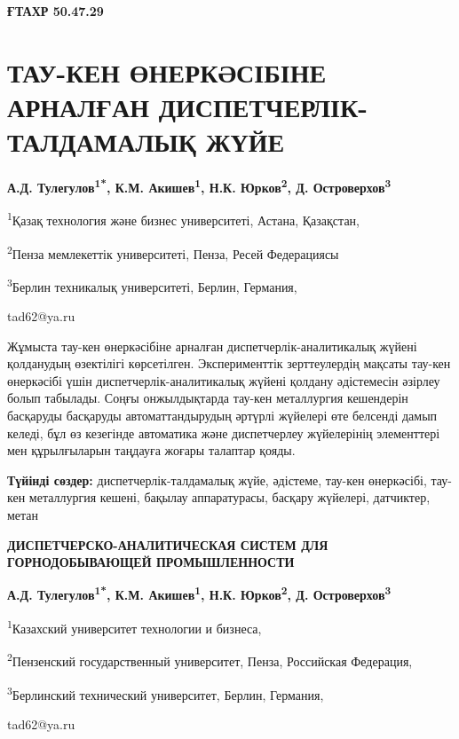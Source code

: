\clearpage
{\bfseries ҒТАХР 50.47.29}

\section{ТАУ-КЕН ӨНЕРКӘСІБІНЕ АРНАЛҒАН ДИСПЕТЧЕРЛІК-ТАЛДАМАЛЫҚ ЖҮЙЕ}

\begin{center}
{\bfseries А.Д. Тулегулов\textsuperscript{1*}, К.М.
Акишев\textsuperscript{1}, Н.К. Юрков\textsuperscript{2}, Д.
Островерхов\textsuperscript{3}}

\textsuperscript{1}Қазақ технология және бизнес университеті, Астана,
Қазақстан,

\textsuperscript{2}Пенза мемлекеттік университеті, Пенза, Ресей
Федерациясы

\textsuperscript{3}Берлин техникалық университеті, Берлин, Германия,

tad62@ya.ru
\end{center}

Жұмыста тау-кен өнеркәсібіне арналған диспетчерлік-аналитикалық жүйені
қолданудың өзектілігі көрсетілген. Эксперименттік зерттеулердің мақсаты
тау-кен өнеркәсібі үшін диспетчерлік-аналитикалық жүйені қолдану
әдістемесін әзірлеу болып табылады. Соңғы онжылдықтарда тау-кен
металлургия кешендерін басқаруды басқаруды автоматтандырудың әртүрлі
жүйелері өте белсенді дамып келеді, бұл өз кезегінде автоматика және
диспетчерлеу жүйелерінің элементтері мен құрылғыларын таңдауға жоғары
талаптар қояды.

{\bfseries Түйінді сөздер:} диспетчерлік-талдамалық жүйе, әдістеме, тау-кен
өнеркәсібі, тау-кен металлургия кешені, бақылау аппаратурасы, басқару
жүйелері, датчиктер, метан

\begin{center}
{\large\bfseries ДИСПЕТЧЕРСКО-АНАЛИТИЧЕСКАЯ СИСТЕМ ДЛЯ ГОРНОДОБЫВАЮЩЕЙ ПРОМЫШЛЕННОСТИ}

{\bfseries А.Д. Тулегулов\textsuperscript{1*}, К.М.
Акишев\textsuperscript{1}, Н.К. Юрков\textsuperscript{2}, Д.
Островерхов\textsuperscript{3}}

\textsuperscript{1}Казахский университет технологии и бизнеса,

\textsuperscript{2}Пензенский государственный университет, Пенза,
Российская Федерация,

\textsuperscript{3}Берлинский технический университет, Берлин, Германия,

tad62@ya.ru
\end{center}

